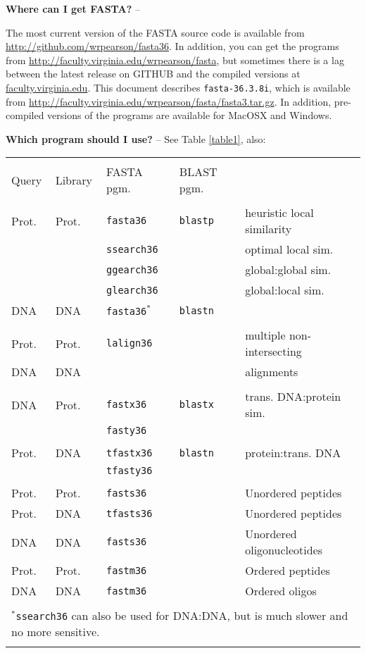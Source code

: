 \documentclass[11pt]{article}
\newcommand{\CURRENT}{fasta-36.3.8i}
\begin{document}
{\noindent}\textbf{Where can I get FASTA?} --

The most current version of the FASTA source code is available from
\url{http://github.com/wrpearson/fasta36}.  In addition, you can get
the programs from \url{http://faculty.virginia.edu/wrpearson/fasta},
but sometimes there is a lag between the latest release on GITHUB and
the compiled versions at \url{faculty.virginia.edu}.  This document
describes \texttt{\CURRENT}, which is available from
\url{http://faculty.virginia.edu/wrpearson/fasta/fasta3.tar.gz}.  In
addition, pre-compiled versions of the programs are available for
MacOSX and Windows.

{\noindent}\textbf{Which program should I use?} -- See Table \ref{table1}, also:\\

\begin{tabular}{l l l l l }
\hline \\[-1.0ex]
Query & Library & FASTA pgm. & BLAST pgm. & \\[1.2ex]
\hline \\[-1.0ex]
Prot. & Prot. & \texttt{fasta36} & \texttt{blastp} & heuristic local similarity \\
 &  & \texttt{ssearch36} &  & optimal local sim.\\
 &  & \texttt{ggearch36} &  & global:global sim. \\
 &  & \texttt{glearch36} &  & global:local sim.\\
DNA & DNA & \texttt{fasta36}$^*$ & \texttt{blastn} & \\[1.2ex]
\hline \\[-1.0ex]
Prot. & Prot. & \texttt{lalign36} & & multiple non-intersecting \\
DNA & DNA & & & alignments \\[1.2ex]
\hline \\[-1.0ex]
DNA & Prot. & \texttt{fastx36} & \texttt{blastx} & trans. DNA:protein sim. \\ 
 &  & \texttt{fasty36} & & \\[1.2ex]
\hline \\[-1.0ex]
Prot. & DNA & \texttt{tfastx36} & \texttt{blastn} & protein:trans. DNA \\
 &  & \texttt{tfasty36} & & \\[1.2ex]
\hline \\[-1.0ex]
Prot. & Prot. & \texttt{fasts36} & & Unordered peptides \\
Prot. & DNA & \texttt{tfasts36} & & Unordered peptides \\
DNA & DNA & \texttt{fasts36} & & Unordered oligonucleotides \\
Prot. & Prot. & \texttt{fastm36} & & Ordered peptides \\
DNA & DNA & \texttt{fastm36} & & Ordered oligos \\[1.2 ex]
\hline \\[-1.0ex]
\multicolumn{5}{l}{$^*$\texttt{ssearch36} can also be used for DNA:DNA, but is much slower and no more sensitive.}\\[0.2ex]
\hline \\
\end{tabular}
\end{document}
